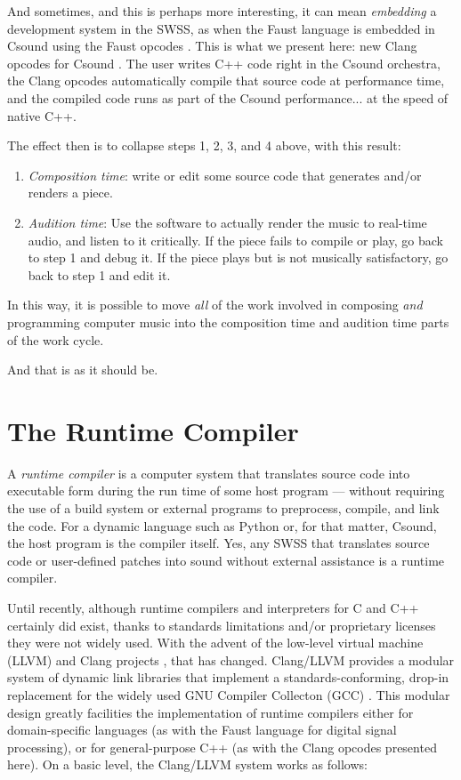 \documentclass[letterpaper, 12pt]{article}
\begin{document}
And sometimes, and this is perhaps more interesting, it can mean \textit{embedding} a development system in the SWSS, as when the Faust language \citep{faust, orlarey2009faust} is embedded in Csound using the Faust opcodes \citep{Lazzarini2014, faustcompile, faustdsp}. This is what we present here: new Clang opcodes for Csound \citep{clangopcodes}. The user writes C++ code right in the Csound orchestra, the Clang opcodes automatically compile that source code at performance time, and the compiled code runs as part of the Csound performance... at the speed of native C++.

The effect then is to collapse steps 1, 2, 3, and 4 above, with this result:

\begin{enumerate}
\item \textit{Composition time}: write or edit some source code that generates and/or renders a piece.
\item \textit{Audition time}: Use the software to actually render the music to real-time audio, and listen to it critically. If the piece fails to compile or play, go back to step 1 and debug it. If the piece plays but is not musically satisfactory, go back to step 1 and edit it.
\end{enumerate}

\indent In this way, it is possible to move \textit{all} of the work involved in composing \textit{and} programming computer music into the composition time and audition time parts of the work cycle.

And that is as it should be.

\section{The Runtime Compiler}

A \textit{runtime compiler} is a computer system that translates source code into executable form during the run time of some host program --- without requiring the use of a build system or external programs to preprocess, compile, and link the code. For a dynamic language such as Python or, for that matter, Csound, the host program is the compiler itself. Yes, any SWSS that translates source code or user-defined patches into sound without external assistance is a runtime compiler.

Until recently, although runtime compilers and interpreters for C and C++ certainly did exist, thanks to standards limitations and/or proprietary licenses \citep{cint, ch} they were not widely used. With the advent of the low-level virtual machine (LLVM) and Clang projects \citep{llvm}, that has changed. Clang/LLVM provides a modular system of dynamic link libraries that implement a standards-conforming, drop-in replacement for the widely used GNU Compiler Collecton (GCC) \citep{gcc}. This modular design greatly facilities the implementation of runtime compilers either for domain-specific languages (as with the Faust language for digital signal processing), or for general-purpose C++ (as with the Clang opcodes presented here). On a basic level, the Clang/LLVM system works as follows:
\end{document}
